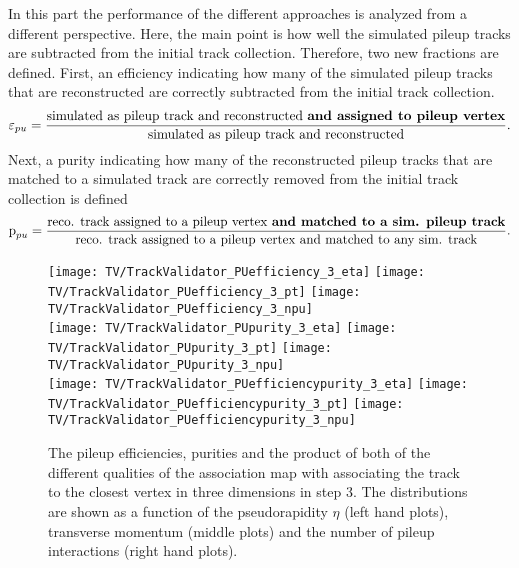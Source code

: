 In this part the performance of the different approaches is analyzed from a different perspective. Here, the main point is how well the simulated pileup tracks are subtracted from the initial track collection. Therefore, two new fractions are defined. First, an efficiency indicating how many of the simulated pileup tracks that are reconstructed are correctly subtracted from the initial track collection.
\begin{equation}
    \varepsilon_{pu} = \frac{\textrm{simulated as pileup track and reconstructed \textbf{and assigned to pileup vertex}}}{\textrm{simulated as pileup track and reconstructed}}.
    \label{eq:PUEfficiency}
\end{equation}
Next, a purity indicating how many of the reconstructed pileup tracks that are matched to a simulated track are correctly removed from the initial track collection is defined
\begin{equation}
    \textrm{p}_{pu} = \frac{\textrm{reco. track assigned to a pileup vertex \textbf{and matched to a sim. pileup track}}}{\textrm{reco. track assigned to a pileup vertex and matched to any sim. track}}.
    \label{eq:PUPurity}
\end{equation}

\begin{figure}[Ht]
    \centering
    \texttt{[image: TV/TrackValidator\_PUefficiency\_3\_eta]}
    \texttt{[image: TV/TrackValidator\_PUefficiency\_3\_pt]}
    \texttt{[image: TV/TrackValidator\_PUefficiency\_3\_npu]}
    \\
    \texttt{[image: TV/TrackValidator\_PUpurity\_3\_eta]}
    \texttt{[image: TV/TrackValidator\_PUpurity\_3\_pt]}
    \texttt{[image: TV/TrackValidator\_PUpurity\_3\_npu]}
    \\
    \texttt{[image: TV/TrackValidator\_PUefficiencypurity\_3\_eta]}
    \texttt{[image: TV/TrackValidator\_PUefficiencypurity\_3\_pt]}
    \texttt{[image: TV/TrackValidator\_PUefficiencypurity\_3\_npu]}
    \caption[Pileup efficiencies, purities and their product of the different qualities of the association map with associating the track to the closest vertex in three dimensions in step 3]{The pileup efficiencies, purities and the product of both of the different qualities of the association map with associating the track to the closest vertex in three dimensions in step 3. The distributions are shown as a function of the pseudorapidity $\eta$ (left hand plots), transverse momentum (middle plots) and the number of pileup interactions (right hand plots). \label{plot:TASEFRDQ3Pileup}}
\end{figure}

